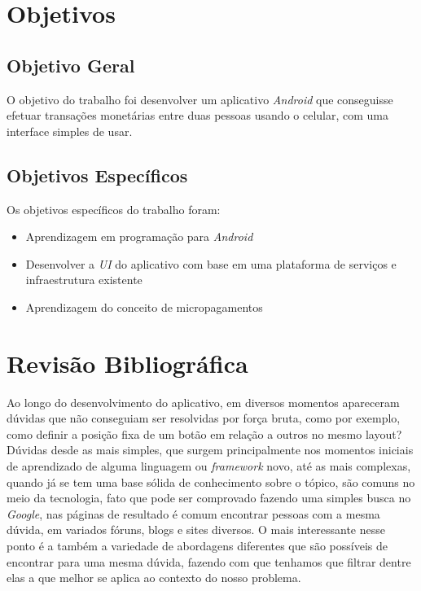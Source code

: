 \documentclass[hidelinks,12pt]{article}
\begin{document}
\section{Objetivos}


\subsection{Objetivo Geral}
O objetivo do trabalho foi desenvolver um aplicativo \textit{Android} que conseguisse efetuar transa\c{c}\~oes monet\'arias entre duas pessoas usando o celular, com uma interface simples de usar.
\newline


\subsection{Objetivos Espec\'ificos}
Os objetivos espec\'ificos do trabalho foram:
\begin{itemize}
	\item Aprendizagem em programa\c{c}\~ao para \textit{Android}
	\item Desenvolver a \textit{UI} do aplicativo com base em uma plataforma de servi\c{c}os e infraestrutura existente
	\item Aprendizagem do conceito de micropagamentos
\end{itemize}
\newpage
\section{Revis\~ao Bibliogr\'afica} \label{revisao}
Ao longo do desenvolvimento do aplicativo, em diversos momentos apareceram d\'uvidas que n\~ao conseguiam ser resolvidas por for\c{c}a bruta, como por exemplo, como definir a posi\c{c}\~ao fixa de um bot\~ao em rela\c{c}\~ao a outros no mesmo layout? D\'uvidas desde as mais simples, que surgem principalmente nos momentos iniciais de aprendizado de alguma linguagem ou \textit{framework} novo, at\'e as mais complexas, quando j\'a se tem uma base s\'olida de conhecimento sobre o t\'opico, s\~ao comuns no meio da tecnologia, fato que pode ser comprovado fazendo uma simples busca no \textit{Google}, nas p\'aginas de resultado \'e comum encontrar pessoas com a mesma d\'uvida, em variados f\'oruns, blogs e  sites diversos. O mais interessante nesse ponto \'e a tamb\'em a variedade de abordagens diferentes que s\~ao poss\'iveis de encontrar para uma mesma d\'uvida, fazendo com que tenhamos que filtrar dentre elas a que melhor se aplica ao contexto do nosso problema.
\end{document}
